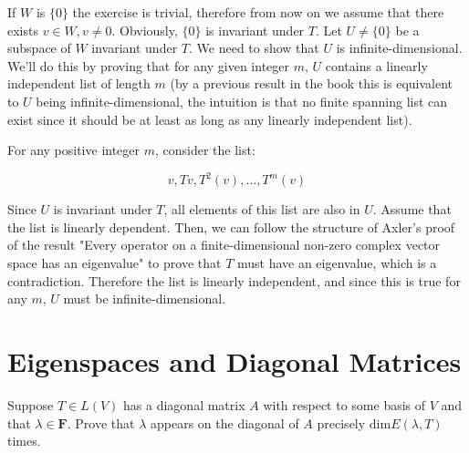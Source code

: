 \begin{solution}

If $W$ is $\{0\}$ the exercise is trivial, therefore from now on we assume that there exists $v \in W, v \neq 0$.
Obviously, $\{0\}$ is invariant under $T$. Let $U \neq \{0\}$ be a subspace of $W$ invariant under $T$. We need to show that $U$ is infinite-dimensional. We'll do this by proving that for any given integer $m$, $U$ contains a linearly independent list of length $m$ (by a previous result in the book this is equivalent to $U$ being infinite-dimensional, the intuition is that no finite spanning list can exist since it should be at least as long as any linearly independent list).

For any positive integer $m$, consider the list:

$$v, Tv, T^2(v), \ldots, T^m(v)$$

Since $U$ is invariant under $T$, all elements of this list are also in $U$. Assume that the list is linearly dependent. Then, we can follow the structure of Axler's proof of the result "Every operator on a finite-dimensional non-zero complex vector space has an eigenvalue" to prove that $T$ must have an eigenvalue, which is a contradiction. Therefore the list is linearly independent, and since this is true for any $m$, $U$ must be infinite-dimensional.
\end{solution}

\section{Eigenspaces and Diagonal Matrices}

\begin{exercise}{7}
Suppose $T \in L(V)$ has a diagonal matrix $A$ with respect to some basis of $V$ and that $\lambda \in \mathbf{F}$. Prove that $\lambda$ appears on the diagonal of $A$ precisely dim$E(\lambda, T)$ times.
\end{exercise}

